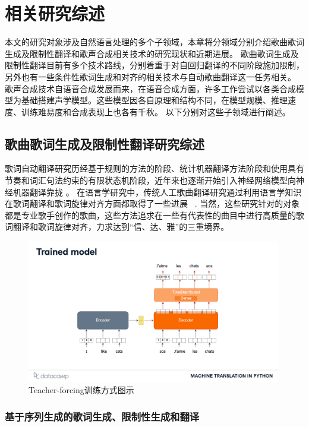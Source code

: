 \chapter{相关研究综述}
本文的研究对象涉及自然语言处理的多个子领域，本章将分领域分别介绍歌曲歌词生成及限制性翻译和歌声合成相关技术的研究现状和近期进展。
歌曲歌词生成及限制性翻译目前有多个技术路线，分别着重于对自回归翻译的不同阶段施加限制，另外也有一些条件性歌词生成和对齐的相关技术与自动歌曲翻译这一任务相关。
歌声合成技术自语音合成发展而来，在语音合成方面，许多工作尝试以各类合成模型为基础搭建声学模型。这些模型因各自原理和结构不同，在模型规模、推理速度、训练难易度和合成表现上也各有千秋。
以下分别对这些子领域进行阐述。
\section{歌曲歌词生成及限制性翻译研究综述}
歌词自动翻译研究历经基于规则的方法的阶段、统计机器翻译方法阶段和使用具有节奏和词汇句法约束的有限状态机阶段\citep{spanish_verse, Manurung2004AnEA, He_Zhou_Jiang_2012}，近年来也逐渐开始引入神经网络模型向神经机器翻译靠拢
\citep{ghazvininejad-etal-2016-generating,ghazvininejad-etal-2017-hafez, ghazvininejad-etal-2018-neural}。
在语言学研究中，传统人工歌曲翻译研究通过利用语言学知识在歌词翻译和歌词旋律对齐方面都取得了一些进展
~\citep{interplay_lyrics_melody,low_2003,low2008translating,low_2022,three_d_of_singability,trans_of_music}.
当然，这些研究针对的对象都是专业歌手创作的歌曲，这些方法追求在一些有代表性的曲目中进行高质量的歌词翻译和歌词旋律对齐，力求达到``信、达、雅''的三重境界。
\begin{figure}[htbp]
  \centering
  \includegraphics[width=0.99\textwidth]{figure/related/teacher-forcing.pdf}
  \caption{Teacher-forcing训练方式图示}
  \label{fig:tf_train}
\end{figure}
\subsection{基于序列生成的歌词生成、限制性生成和翻译}
